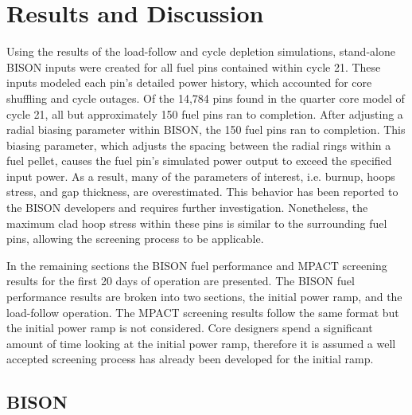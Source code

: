 \documentclass[edeposit,fullpage,11pt]{uiucthesis2009}
\begin{document}



\chapter{Results and Discussion}
Using the results of the load-follow and  cycle depletion simulations, stand-alone BISON inputs were created for all fuel pins contained within cycle 21. 
These inputs modeled each pin's detailed power history, which accounted for core shuffling and cycle outages. 
Of the 14,784 pins found in the quarter core model of cycle 21, all but approximately 150 fuel pins ran to completion.
After adjusting a radial biasing parameter within BISON, the 150 fuel pins ran to completion.
This biasing parameter, which adjusts the spacing between the radial rings within a fuel pellet, causes the fuel pin's simulated power output to exceed the specified input power.
As a result, many of the parameters of interest, i.e. burnup, hoops stress, and gap thickness, are overestimated.
This behavior has been reported to the BISON developers and requires further investigation. 
Nonetheless, the maximum clad hoop stress within these pins is similar to the surrounding fuel pins, allowing the screening process to be applicable.

In the remaining sections the BISON fuel performance and MPACT screening results for the first 20 days of operation are presented.
The BISON fuel performance results are broken into two sections, the initial power ramp, and the load-follow operation.
The MPACT screening results follow the same format but the initial power ramp is not considered. 
Core designers spend a significant amount of time looking at the initial power ramp, therefore it is assumed a well accepted screening process has already been developed for the initial ramp.

\section{BISON}
\end{document}
